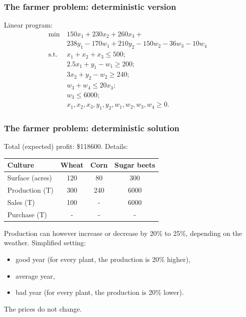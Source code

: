\documentclass{beamer}
\begin{document}
\begin{frame}
\frametitle{The farmer problem: deterministic version}

Linear program:
\begin{align*}
\min\ & 150x_1 + 230x_2 + 260x_3 +\\
&  238y_1 - 170w_1 + 210y_2 - 150w_2 -36w_3 - 10w_4 \\
\text{s.t. } & x_1 + x_2 + x_3 \leq 500; \\
& 2.5x_1 + y_1 - w_1 \geq 200; \\
& 3x_2 + y_2 - w_2 \geq 240; \\
& w_3 + w_4 \leq 20 x_3; \\
& w_3 \leq 6000; \\
& x_1, x_2, x_3, y_1, y_2, w_1, w_2, w_3, w_4 \geq 0.
\end{align*}

\end{frame}

\begin{frame}
\frametitle{The farmer problem: deterministic solution}

Total (expected) profit: \$118600. Details:
\begin{center}
\begin{tabular}{lccc}
\hline
Culture & Wheat & Corn & Sugar beets \\
\hline
Surface (acres) & 120 & 80 & 300 \\
Production (T) & 300 & 240 & 6000 \\
Sales (T) & 100 & - & 6000 \\
Purchase (T) & - & - & - \\
\hline
\end{tabular}
\end{center}

\mbox{}

Production can however increase or decrease by 20\% to 25\%, depending on the weather.
Simplified setting:
\begin{itemize}
	\item 
good year (for every plant, the production is 20\% higher),
\item
average year,
\item
bad year (for every plant, the production is 20\% lower).
\end{itemize}
The prices do not change.
\end{frame}
\end{document}
